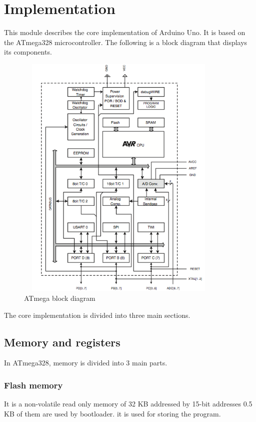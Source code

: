 \chapter{Implementation}
\label{chap:implementation}

This module describes the core implementation of Arduino Uno. It is based on the ATmega328 microcontroller. The following is a block diagram that displays its components.



\begin{figure}[h!]
\centering
\includegraphics[height=12cm, width=10cm]{ArduinoBlockDiagram.png}
\caption{ATmega block diagram \protect\cite{BlockDiagram:URL}}
\label{Arduino Uno block diagram}
\end{figure}



\noindent \large The core implementation is divided into three main sections.

\section{Memory and registers}

In ATmega328, memory is divided into 3 main parts.
\subsection{Flash memory}
It is a non-volatile read only memory of 32 KB addressed by 15-bit addresses 0.5 KB of them are used by bootloader. it is used for storing the program. 

